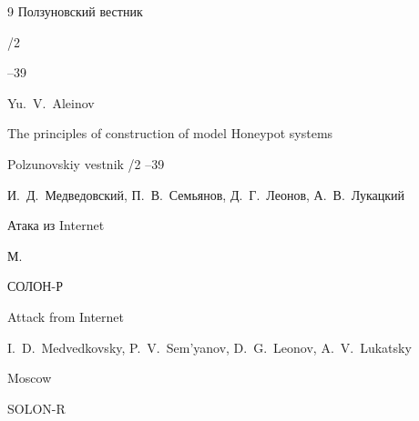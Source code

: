 \begin{thebibliography}{9}
\jour Ползуновский вестник


/2

--39

\misctransl

\by Yu.~V.~Aleinov

\paper The principles of construction of model Honeypot  systems 

\jour Polzunovskiy vestnik  /2 --39








\by И.~Д.~Медведовский, П.~В.~Семьянов, Д.~Г.~Леонов, А.~В.~Лукацкий

\book  Атака из Internet

\publaddr М.

\publ СОЛОН-Р



\misctransl

\book Attack from Internet


\by I.~D.~Medvedkovsky, P.~V.~Sem'yanov, D.~G.~Leonov, A.~V.~Lukatsky

\publaddr Moscow

\publ SOLON-R





\end{thebibliography}







\noindent

\hskip6.5cm \thedate \par\noindent

\hskip6.5cm\therevdate




%




\makeengtitlem





\newpage





%

%

%

%

%

%

